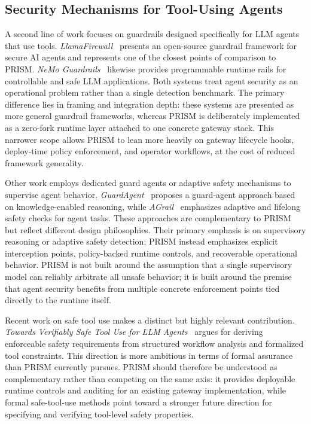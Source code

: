 \subsection{Security Mechanisms for Tool-Using Agents}

A second line of work focuses on guardrails designed specifically for LLM agents that use tools. \emph{LlamaFirewall}~\cite{llamafirewall2025} presents an open-source guardrail framework for secure AI agents and represents one of the closest points of comparison to PRISM. \emph{NeMo Guardrails}~\cite{nemoguardrails2023} likewise provides programmable runtime rails for controllable and safe LLM applications. Both systems treat agent security as an operational problem rather than a single detection benchmark. The primary difference lies in framing and integration depth: these systems are presented as more general guardrail frameworks, whereas PRISM is deliberately implemented as a zero-fork runtime layer attached to one concrete gateway stack. This narrower scope allows PRISM to lean more heavily on gateway lifecycle hooks, deploy-time policy enforcement, and operator workflows, at the cost of reduced framework generality.

Other work employs dedicated guard agents or adaptive safety mechanisms to supervise agent behavior. \emph{GuardAgent}~\cite{guardagent2024} proposes a guard-agent approach based on knowledge-enabled reasoning, while \emph{AGrail}~\cite{agrail2025} emphasizes adaptive and lifelong safety checks for agent tasks. These approaches are complementary to PRISM but reflect different design philosophies. Their primary emphasis is on supervisory reasoning or adaptive safety detection; PRISM instead emphasizes explicit interception points, policy-backed runtime controls, and recoverable operational behavior. PRISM is not built around the assumption that a single supervisory model can reliably arbitrate all unsafe behavior; it is built around the premise that agent security benefits from multiple concrete enforcement points tied directly to the runtime itself.

Recent work on safe tool use makes a distinct but highly relevant contribution. \emph{Towards Verifiably Safe Tool Use for LLM Agents}~\cite{safe-tool-use2026} argues for deriving enforceable safety requirements from structured workflow analysis and formalized tool constraints. This direction is more ambitious in terms of formal assurance than PRISM currently pursues. PRISM should therefore be understood as complementary rather than competing on the same axis: it provides deployable runtime controls and auditing for an existing gateway implementation, while formal safe-tool-use methods point toward a stronger future direction for specifying and verifying tool-level safety properties.

